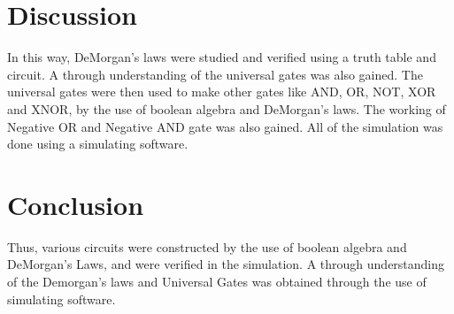 \documentclass[a4paper, 12pt]{article}
\begin{document}
\section{Discussion}
In this way, DeMorgan's laws were studied and verified using a truth table and circuit. A through understanding of the universal gates was also gained. The universal gates were then used to make other gates like AND, OR, NOT, XOR and XNOR, by the use of boolean algebra and DeMorgan's laws. The working of Negative OR and Negative AND gate was also gained. All of the simulation was done using a simulating software.

\section{Conclusion}
Thus, various circuits were constructed by the use of boolean algebra and DeMorgan's Laws, and were verified in the simulation.
A through understanding of the Demorgan's laws and Universal Gates was obtained through the use of simulating software.
\end{document}
